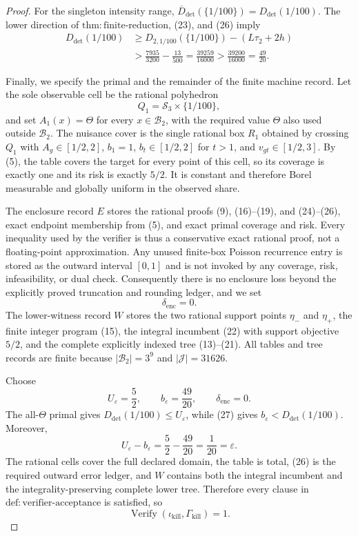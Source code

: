\documentclass{article}
\begin{document}
\begin{proof}
For the singleton intensity range, \(\overline D_{\mathrm{det}}(\{1/100\})=D_{\mathrm{det}}(1/100)\). The lower direction of \(\mathrm{thm{:}finite\text{-}reduction}\), (23), and (26) imply
\[
 \begin{aligned}
 D_{\mathrm{det}}(1/100)
 &\ge D_{2,1/100}(\{1/100\})-(L\tau_2+2h)\\
 &>\frac{7935}{3200}-\frac{13}{500}
 =\frac{39259}{16000}
 >\frac{39200}{16000}=\frac{49}{20}.
\end{aligned}
\tag{27}
\]

Finally, we specify the primal and the remainder of the finite machine record. Let the sole observable cell be the rational polyhedron
\[
 Q_1=\mathcal S_3\times\{1/100\},
\]
and set \(A_1(x)=\Theta\) for every \(x\in\mathcal B_2\), with the required value \(\Theta\) also used outside \(\mathcal B_2\). The nuisance cover is the single rational box \(R_1\) obtained by crossing \(Q_1\) with \(A_g\in[1/2,2]\), \(b_1=1\), \(b_t\in[1/2,2]\) for \(t>1\), and \(v_{gt}\in[1/2,3]\). By (5), the table covers the target for every point of this cell, so its coverage is exactly one and its risk is exactly \(5/2\). It is constant and therefore Borel measurable and globally uniform in the observed share.

The enclosure record \(E\) stores the rational proofs (9), (16)--(19), and (24)--(26), exact endpoint membership from (5), and exact primal coverage and risk. Every inequality used by the verifier is thus a conservative exact rational proof, not a floating-point approximation. Any unused finite-box Poisson recurrence entry is stored as the outward interval \([0,1]\) and is not invoked by any coverage, risk, infeasibility, or dual check. Consequently there is no enclosure loss beyond the explicitly proved truncation and rounding ledger, and we set
\[
 \delta_{\mathrm{enc}}=0.
\tag{28}
\]
The lower-witness record \(W\) stores the two rational support points \(\eta_-\) and \(\eta_+\), the finite integer program (15), the integral incumbent (22) with support objective \(5/2\), and the complete explicitly indexed tree (13)--(21). All tables and tree records are finite because \(|\mathcal B_2|=3^9\) and \(|\mathscr J|=31626\).

Choose
\[
 U_\varepsilon=\frac52,\qquad b_\varepsilon=\frac{49}{20},
 \qquad \delta_{\mathrm{enc}}=0.
\tag{29}
\]
The all-\(\Theta\) primal gives \(D_{\mathrm{det}}(1/100)\le U_\varepsilon\), while (27) gives \(b_\varepsilon<D_{\mathrm{det}}(1/100)\). Moreover,
\[
 U_\varepsilon-b_\varepsilon=\frac52-\frac{49}{20}=\frac1{20}=\varepsilon.
\tag{30}
\]
The rational cells cover the full declared domain, the table is total, (26) is the required outward error ledger, and \(W\) contains both the integral incumbent and the integrality-preserving complete lower tree. Therefore every clause in \(\mathrm{def{:}verifier\text{-}acceptance}\) is satisfied, so
\[
 \operatorname{Verify}(\iota_{\mathrm{kill}},\Gamma_{\mathrm{kill}})=1.
\]
\end{proof}
\end{document}
